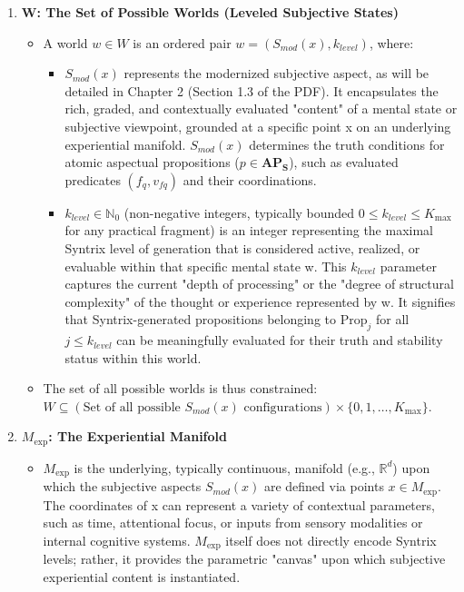 \documentclass[
    12pt,              %
    a4paper,           %
    headings=normal,   %
    twoside=true,      %
    BCOR=8mm,          %
]{scrbook}
\newcommand{\Smodx}{S_{mod}(x)}
\newcommand{\Mexp}{M_{\text{exp}}}
\newcommand{\Kmax}{K_{\text{max}}}
\newcommand{\APS}{\mathbf{AP_S}}
\newcommand{\Propk}[1]{\text{Prop}_{#1}}
\begin{document}
\begin{enumerate}[label=\arabic*.]
    \item  \textbf{W: The Set of Possible Worlds (Leveled Subjective States)}
        \begin{itemize}
            \item   A world \(w \in W\) is an ordered pair \(w = (\Smodx, k_{level})\), where:
                \begin{itemize}
                    \item   \(\Smodx\) represents the modernized subjective aspect, as will be detailed in Chapter 2 (Section 1.3 of the PDF). It encapsulates the rich, graded, and contextually evaluated "content" of a mental state or subjective viewpoint, grounded at a specific point x on an underlying experiential manifold. \(\Smodx\) determines the truth conditions for atomic aspectual propositions (\(p \in \APS\)), such as evaluated predicates \((f_q, v_{fq})\) and their coordinations.
                    \item   \(k_{level} \in \mathbb{N}_0\) (non-negative integers, typically bounded \(0 \le k_{level} \le \Kmax\) for any practical fragment) is an integer representing the maximal Syntrix level of generation that is considered active, realized, or evaluable within that specific mental state w. This \(k_{level}\) parameter captures the current "depth of processing" or the "degree of structural complexity" of the thought or experience represented by w. It signifies that Syntrix-generated propositions belonging to \(\Propk{j}\) for all \(j \le k_{level}\) can be meaningfully evaluated for their truth and stability status within this world.
                \end{itemize}
            \item   The set of all possible worlds is thus constrained: \(W \subseteq (\text{Set of all possible } \Smodx \text{ configurations}) \times \{0, 1, \dots, \Kmax\}\).
        \end{itemize}

    \item  \textbf{\(\Mexp\): The Experiential Manifold}
        \begin{itemize}
            \item   \(\Mexp\) is the underlying, typically continuous, manifold (e.g., \(\mathbb{R}^d\)) upon which the subjective aspects \(\Smodx\) are defined via points \(x \in \Mexp\). The coordinates of x can represent a variety of contextual parameters, such as time, attentional focus, or inputs from sensory modalities or internal cognitive systems. \(\Mexp\) itself does not directly encode Syntrix levels; rather, it provides the parametric "canvas" upon which subjective experiential content is instantiated.
        \end{itemize}


\end{enumerate}
\end{document}
